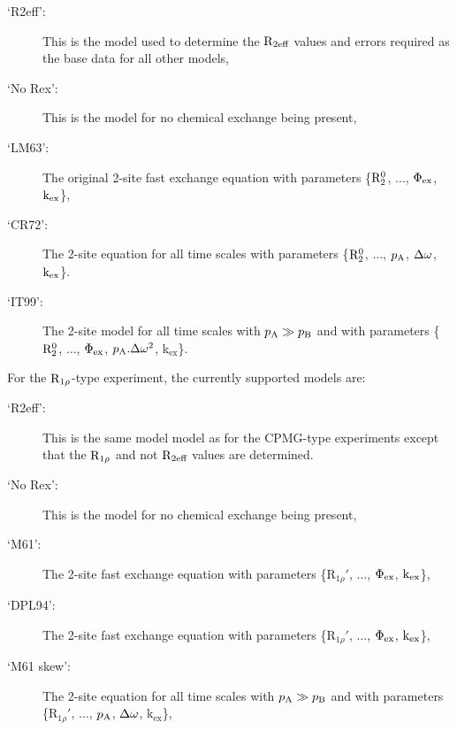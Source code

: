 \begin{description}
\item[`R2eff':]  This is the model used to determine the $\mathrm{R}_{2\textrm{eff}}$ values and errors required as the base data for all other models,
\item[`No Rex':]  This is the model for no chemical exchange being present,
\item[`LM63':]  The original \citet{LuzMeiboom63} 2-site fast exchange equation with parameters \{$\mathrm{R}_2^0$, $\dots$, $\Phi_\textrm{ex}$, $\textrm{k}_\textrm{ex}$\},
\item[`CR72':]  The \citet{CarverRichards72} 2-site equation for all time scales with parameters \{$\mathrm{R}_2^0$, $\dots$, $p_\textrm{A}$, $\Delta\omega$, $\textrm{k}_\textrm{ex}$\}.
\item[`IT99':]  The \citet{IshimaTorchia99} 2-site model for all time scales with $p_\textrm{A} \gg p_\textrm{B}$ and with parameters \{$\mathrm{R}_2^0$, $\dots$, $\Phi_\textrm{ex}$, $p_\textrm{A}.\Delta\omega^2$, k$_\textrm{ex}$\}.
\end{description}

For the $\mathrm{R}_{1\rho}$-type experiment, the currently supported models are:

\begin{description}
\item[`R2eff':]  This is the same model model as for the CPMG-type experiments except that the $\mathrm{R}_{1\rho}$ and not $\mathrm{R}_{2\textrm{eff}}$ values are determined.
\item[`No Rex':]  This is the model for no chemical exchange being present,
\item[`M61':]  The \citet{Meiboom61} 2-site fast exchange equation with parameters \{$\mathrm{R}_{1\rho}'$, $\dots$, $\Phi_\textrm{ex}$, $\textrm{k}_\textrm{ex}$\},
\item[`DPL94':]  The \citet{Davis94} 2-site fast exchange equation with parameters \{$\mathrm{R}_{1\rho}'$, $\dots$, $\Phi_\textrm{ex}$, $\textrm{k}_\textrm{ex}$\},
\item[`M61 skew':]  The \citet{Meiboom61} 2-site equation for all time scales with $p_\textrm{A} \gg p_\textrm{B}$ and with parameters \{$\mathrm{R}_{1\rho}'$, $\dots$, $p_\textrm{A}$, $\Delta\omega$, k$_\textrm{ex}$\},
\end{description}

